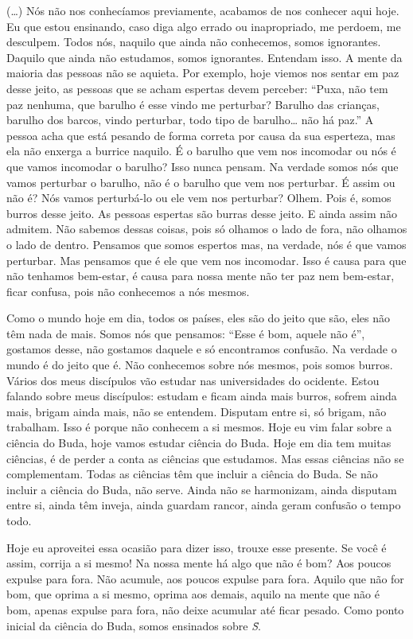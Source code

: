 (…) Nós não nos conhecíamos previamente, acabamos de nos conhecer
aqui hoje. Eu que estou ensinando, caso diga algo errado ou
inapropriado, me perdoem, me desculpem. Todos nós, naquilo que ainda
não conhecemos, somos ignorantes. Daquilo que ainda não estudamos,
somos ignorantes. Entendam isso. A mente da maioria das pessoas não se
aquieta. Por exemplo, hoje viemos nos sentar em paz desse jeito, as
pessoas que se acham espertas devem perceber: “Puxa, não tem paz
nenhuma, que barulho é esse vindo me perturbar? Barulho das crianças,
barulho dos barcos, vindo perturbar, todo tipo de barulho… não há paz.”
A pessoa acha que está pesando de forma correta por causa da sua
esperteza, mas ela não enxerga a burrice naquilo. É o barulho que vem
nos incomodar ou nós é que vamos incomodar o barulho? Isso nunca
pensam. Na verdade somos nós que vamos perturbar o barulho, não é o
barulho que vem nos perturbar. É assim ou não é? Nós vamos perturbá-lo
ou ele vem nos perturbar? Olhem. Pois é, somos burros desse jeito. As
pessoas espertas são burras desse jeito. E ainda assim não admitem. Não
sabemos dessas coisas, pois só olhamos o lado de fora, não olhamos o
lado de dentro. Pensamos que somos espertos mas, na verdade, nós é que
vamos perturbar. Mas pensamos que é ele que vem nos incomodar. Isso é
causa para que não tenhamos bem-estar, é causa para nossa mente não ter
paz nem bem-estar, ficar confusa, pois não conhecemos a nós mesmos.

Como o mundo hoje em dia, todos os países, eles são do jeito que
são, eles não têm nada de mais. Somos nós que pensamos: “Esse é bom,
aquele não é”, gostamos desse, não gostamos daquele e só encontramos
confusão. Na verdade o mundo é do jeito que é. Não conhecemos sobre nós
mesmos, pois somos burros. Vários dos meus discípulos vão estudar nas
universidades do ocidente. Estou falando sobre meus discípulos: estudam
e ficam ainda mais burros, sofrem ainda mais, brigam ainda mais, não se
entendem. Disputam entre si, só brigam, não trabalham. Isso é porque
não conhecem a si mesmos. Hoje eu vim falar sobre a ciência do Buda,
hoje vamos estudar ciência do Buda. Hoje em dia tem muitas ciências, é
de perder a conta as ciências que estudamos. Mas essas ciências não se
complementam. Todas as ciências têm que incluir a ciência do Buda. Se
não incluir a ciência do Buda, não serve. Ainda não se harmonizam,
ainda disputam entre si, ainda têm inveja, ainda guardam rancor, ainda
geram confusão o tempo todo.

Hoje eu aproveitei essa ocasião para dizer isso, trouxe esse
presente. Se você é assim, corrija a si mesmo! Na nossa mente há algo
que não é bom? Aos poucos expulse para fora. Não acumule, aos poucos
expulse para fora. Aquilo que não for bom, que oprima a si mesmo,
oprima aos demais, aquilo na mente que não é bom, apenas expulse para
fora, não deixe acumular até ficar pesado. Como ponto inicial da
ciência do Buda, somos ensinados sobre \textit{S\=\ila}. 

